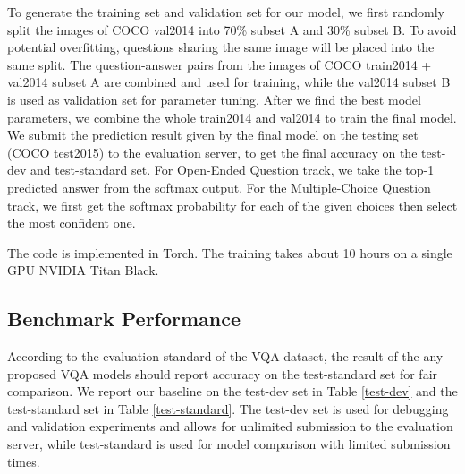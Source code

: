 \documentclass{article} %
\begin{document}
To generate the training set and validation set for our model, we first randomly split the images of COCO val2014 into 70\% subset A and 30\% subset B. To avoid potential overfitting, questions sharing the same image will be placed into the same split. The question-answer pairs from the images of COCO train2014 + val2014 subset A are combined and used for training, while the val2014 subset B is used as validation set for parameter tuning. After we find the best model parameters, we combine the whole train2014 and val2014 to train the final model. We submit the prediction result given by the final model on the testing set (COCO test2015) to the evaluation server, to get the final accuracy on the test-dev and test-standard set. For Open-Ended Question track, we take the top-1 predicted answer from the softmax output. For the Multiple-Choice Question track, we first get the softmax probability for each of the given choices then select the most confident one.

The code is implemented in Torch. The training takes about 10 hours on a single GPU NVIDIA Titan Black.



\subsection{Benchmark Performance}

According to the evaluation standard of the VQA dataset, the result of the any proposed VQA models should report accuracy on the test-standard set for fair comparison. We report our baseline on the test-dev set in Table \ref{test-dev} and the test-standard set in Table \ref{test-standard}. The test-dev set is used for debugging and validation experiments and allows for unlimited submission to the evaluation server, while test-standard is used for model comparison with limited submission times.
\end{document}
